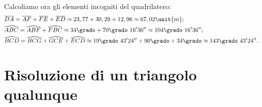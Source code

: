\begin{exrig}
\begin{esempio}
Calcoliamo ora gli elementi incogniti del quadrilatero:
\begin{align*}
&\overline{DA}=\overline{AF}+\overline{FE}+\overline{ED}\approx23,77+30,29+12,
96\approx67,02\unit{m};\\
&\widehat{ABC}=\widehat{ABF}+\widehat{FBC}\approx34\grado+70\grado~16' 
36''\approx104\grado~16' 36'';\\
&\widehat{BCD}= \widehat{BCG}+\widehat{GCE}+\widehat{ECD}\approx19\grado~43' 
24''+90\grado+34\grado\approx143\grado~43' 24''.
\end{align*}
\end{esempio}
\end{exrig}

% 

\section{Risoluzione di un triangolo qualunque}
\label{sec:trigo_triangoloqualunque}

